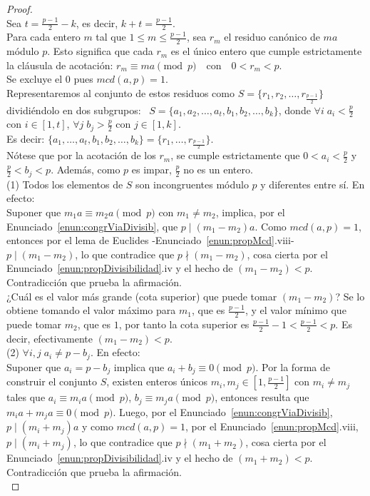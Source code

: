 \begin{proof} \, \\
Sea $t = \frac{p-1}{2} - k$, es decir, $k+t = \frac{p-1}{2}$. \\
Para cada entero $m$ tal que $1 \leq m \leq \frac{p-1}{2}$, sea $r_m$ el residuo canónico de $ma$ módulo $p$. Esto significa que cada $r_m$ es el único entero que cumple estrictamente la cláusula de acotación: $r_m \equiv ma \pmod p \quad \text{con} \quad 0 < r_m < p$. \\ 
Se excluye el $0$ pues $mcd(a,p)=1$. \\
Representaremos al conjunto de estos residuos como $S = \{r_1, r_2, \dots, r_{\frac{p-1}{2}}\}$ dividiéndolo en dos subgrupos: \
$S = \{ a_{1}, a_{2}, \dots, a_{t}, b_{1}, b_{2}, \dots, b_{k} \}$, donde $\forall i \; a_{i} < \frac{p}{2}$ con $i \in [1,t]$, $\forall j \; b_{j} > \frac{p}{2}$ con $j \in [1,k]$. \\
 Es decir: $\{ a_{1},\ldots,a_{t},b_{1},b_{2},\ldots,b_{k} \} = \{ r_1,\ldots,r_{\frac{p-1}{2}} \}$. \\
Nótese que por la acotación de los $r_m$, se cumple estrictamente que $0 < a_i < \frac{p}{2}$ y $\frac{p}{2} < b_j < p$. Además, como $p$ es impar, $\frac{p}{2}$ no es un entero. \\
(1) Todos los elementos de $S$ son incongruentes módulo $p$ y diferentes entre sí. En efecto: \\
Suponer que $m_{1}a \equiv m_{2}a \pmod{p}$ con $m_{1} \ne m_{2}$, implica, por el Enunciado~\ref{enun:congrViaDivisib}, que $p \mid (m_{1}-m_{2})a$. Como $mcd(a,p)=1$, entonces por el lema de Euclides -Enunciado~\ref{enun:propMcd}.viii- $p \mid (m_{1}-m_{2})$, lo que contradice que $p \nmid (m_{1}-m_{2})$, cosa cierta por el Enunciado~\ref{enun:propDivisibilidad}.iv y el hecho de $(m_{1}-m_{2}) < p$. Contradicción que prueba la afirmación. \\
¿Cuál es el valor más grande (cota superior) que puede tomar $(m_{1}-m_{2})$? Se lo obtiene tomando el valor máximo para $m_{1}$, que es $\frac{p-1}{2}$, y el valor mínimo que puede tomar $m_{2}$, que es $1$, por tanto la cota superior es $\frac{p-1}{2} - 1 < \frac{p-1}{2} < p$. Es decir, efectivamente $(m_{1}-m_{2}) < p$. \\
(2) $\forall i,j \; a_{i} \ne p-b_{j}$. En efecto: \\
Suponer que $a_{i} = p-b_{j}$ implica que $a_{i}+b_{j} \equiv 0 \pmod{p}$. Por la forma de construir el conjunto $S$, existen enteros únicos $m_i, m_j \in [1,\frac{p-1}{2}]$ con $m_{i} \ne m_{j}$ tales que $a_{i} \equiv m_{i}a \pmod p$, $b_{j} \equiv m_{j}a \pmod p$, entonces resulta que $m_{i}a + m_{j}a \equiv 0 \pmod{p}$. Luego, por el Enunciado~\ref{enun:congrViaDivisib}, $p \mid (m_{i}+m_{j})a$ y como $mcd(a,p)=1$, por el Enunciado~\ref{enun:propMcd}.viii, $p \mid (m_{i}+m_{j})$, lo que contradice que $p \nmid (m_{1}+m_{2})$, cosa cierta por el Enunciado~\ref{enun:propDivisibilidad}.iv y el hecho de $(m_{1}+m_{2}) < p$. Contradicción que prueba la afirmación. \\

\end{proof}
